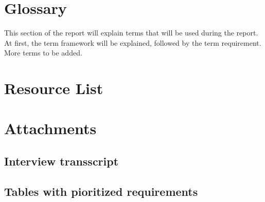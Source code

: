 \documentclass[paper=a4, fontsize=11pt,twoside]{scrartcl}	%
\begin{document}
\section{Glossary}
This section of the report will explain terms that will be used during the report. At first, the term framework will be explained, followed by the term requirement. More terms to be added.
\newpage

\section{Resource List}


\newpage

\section{Attachments}

\subsection{Interview transscript}


\subsection{Tables with pioritized requirements}




\end{document}
